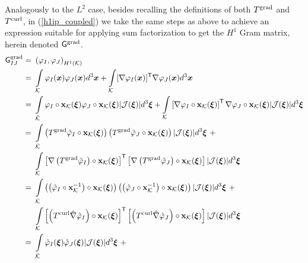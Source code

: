Analogously to the $L^2$ case, besides recalling the definitions of both $T^{\operatorname{grad}}$ and $T^{\operatorname{curl}}$, in (\ref{h1ip_coupled}) we take the same steps as above to achieve an expression suitable for applying sum factorization to get the $H^1$ Gram matrix, herein denoted $\mathsf{G}^{\operatorname{grad}}$.
% 
\begin{align}
                          \sfG^{\grad}_{IJ}  =\ &\left(\varphi_I,\varphi_J\right)_{\HSo^1(\mcK)} \nonumber\\
                                        \ =\ & \int\limits_{\mcK}\varphi_I(\bsx)\varphi_J(\bsx)d^3\bsx + \int\limits_{\mcK}[\nabla\varphi_I(\bsx)]^\T\nabla\varphi_J(\bsx)d^3\bsx \nonumber\\
                                        \ =\ & \int\limits_{\hatK}\varphi_I\circ\bfx_\mcK(\bsxi)\varphi_J\circ\bfx_\mcK(\bsxi)|\mcJ(\bsxi)|d^3\bsxi +
                                        \int\limits_{\mcK}\left[\nabla\varphi_I\circ\bfx_\mcK(\bsxi)\right]^\T\nabla\varphi_J\circ\bfx_\mcK(\bsxi)|\mcJ(\bsxi)|d^3\bsxi \nonumber\\
                                        \ =\ & \int\limits_{\hatK}
                                        \left(T^{\grad}\hat{\varphi}_I\circ\bfx_\mcK(\bsxi)\right)\left(T^{\grad}\hat{\varphi}_J\circ\bfx_\mcK(\bsxi)\right)|\mcJ(\bsxi)|d^3\bsxi \ +\nonumber\\*
                                        \ & \int\limits_{\mcK}
                                        \left[\nabla\left(T^{\grad}\hat{\varphi}_I\right)\circ\bfx_\mcK(\bsxi)\right]^\T\left[\nabla \left(T^{\grad}\hat{\varphi}_J\right)\circ\bfx_\mcK(\bsxi)\right]|\mcJ(\bsxi)|d^3\bsxi \nonumber\\
                                        =\ & \int\limits_{\hatK}
                                        \left(\left(\hat{\varphi}_I\circ\bfx_\mcK^{-1}\right)\circ\bfx_\mcK(\bsxi)\right)\left(\left(\hat{\varphi}_J\circ\bfx_\mcK^{-1}\right)\circ\bfx_\mcK(\bsxi)\right)|\mcJ(\bsxi)|d^3\bsxi \ +\nonumber\\*
                                        \ & \int\limits_{\mcK}
                                        \left[\left(T^{\curl}\hat{\nabla}\hat{\varphi}_I\right)\circ\bfx_\mcK(\bsxi)\right]^\T \left[\left(T^{\curl}\hat{\nabla}\hat{\varphi}_J\right)\circ\bfx_\mcK(\bsxi)\right]|\mcJ(\bsxi)|d^3\bsxi \nonumber\\
                                        =\ & \int\limits_{\hatK}
                                        \hat{\varphi}_I(\bsxi)\hat{\varphi}_J(\bsxi)|\mcJ(\bsxi)|d^3\bsxi \ +\nonumber\\*

\end{align}
